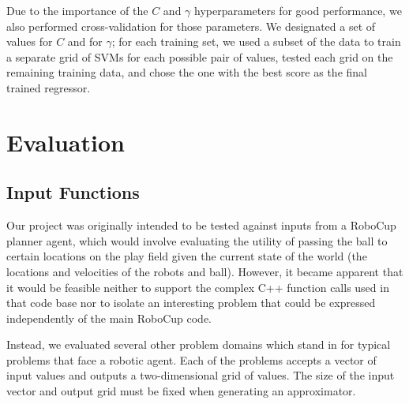 \documentclass{article}
\begin{document}
Due to the importance of the $C$ and $\gamma$ hyperparameters for good performance, we also performed cross-validation for those parameters. We designated a set of values for $C$ and for $\gamma$; for each training set, we used a subset of the data to train a separate grid of SVMs for each possible pair of values, tested each grid on the remaining training data, and chose the one with the best score as the final trained regressor.

\section{Evaluation}

\subsection{Input Functions}

Our project was originally intended to be tested against inputs from a RoboCup planner agent, which would involve evaluating the utility of passing the ball to certain locations on the play field given the current state of the world (the locations and velocities of the robots and ball). However, it became apparent that it would be feasible neither to support the complex C++ function calls used in that code base nor to isolate an interesting problem that could be expressed independently of the main RoboCup code.

Instead, we evaluated several other problem domains which stand in for typical problems that face a robotic agent. Each of the problems accepts a vector of input values and outputs a two-dimensional grid of values. The size of the input vector and output grid must be fixed when generating an approximator.
\end{document}
